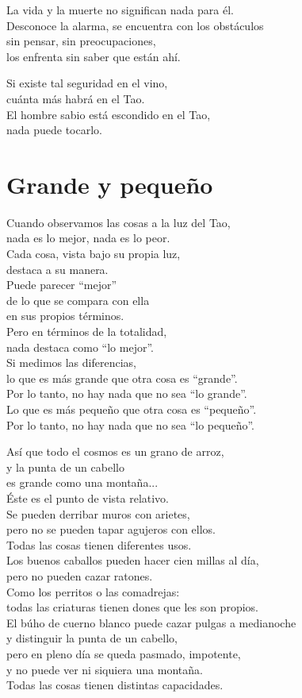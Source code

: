 \documentclass[hidelinks]{memoir}
\begin{document}
	La vida y la muerte no significan nada para él.\\
	Desconoce la alarma, se encuentra con los obstáculos\\
	sin pensar, sin preocupaciones,\\
	los enfrenta sin saber que están ahí.
	
	Si existe tal seguridad en el vino,\\
	cuánta más habrá en el Tao.\\
	El hombre sabio está escondido en el Tao,\\
	nada puede tocarlo.
	
	\chapter*{Grande y pequeño}
	
	Cuando observamos las cosas a la luz del Tao,\\
	nada es lo mejor, nada es lo peor.\\
	Cada cosa, vista bajo su propia luz,\\
	destaca a su manera.\\
	Puede parecer ``mejor''\\
	de lo que se compara con ella\\
	en sus propios términos.\\
	Pero en términos de la totalidad,\\
	nada destaca como ``lo mejor''.\\
	Si medimos las diferencias,\\
	lo que es más grande que otra cosa es ``grande''.\\
	Por lo tanto, no hay nada que no sea ``lo grande''.\\
	Lo que es más pequeño que otra cosa es ``pequeño''.\\
	Por lo tanto, no hay nada que no sea ``lo pequeño''.
	
	Así que todo el cosmos es un grano de arroz,\\
	y la punta de un cabello\\
	es grande como una montaña...\\
	Éste es el punto de vista relativo.\\
	Se pueden derribar muros con arietes,\\
	pero no se pueden tapar agujeros con ellos.\\
	Todas las cosas tienen diferentes usos.\\
	Los buenos caballos pueden hacer cien millas al día,\\
	pero no pueden cazar ratones.\\
	Como los perritos o las comadrejas:\\
	todas las criaturas tienen dones que les son propios.\\
	El búho de cuerno blanco puede cazar pulgas a medianoche\\
	y distinguir la punta de un cabello,\\
	pero en pleno día se queda pasmado, impotente,\\
	y no puede ver ni siquiera una montaña.\\
	Todas las cosas tienen distintas capacidades.
	
\end{document}
